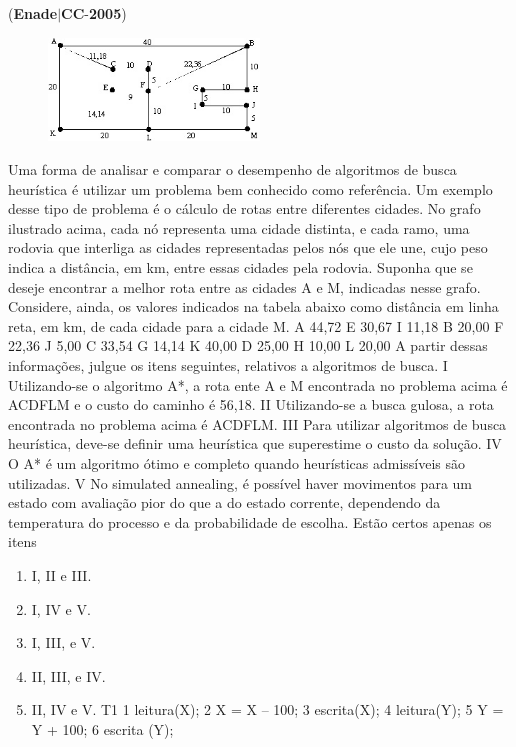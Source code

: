 \documentclass{exam}
\begin{document}
\begin{questions}
\question (\textbf{Enade}$|$\textbf{CC}-\textbf{2005}) \begin{figure}[H]
	\begin{center}
		\includegraphics[width=0.5\textwidth]{CIENCIA_DA_COMPUTACAO_Prova2005-utf8_figuras/fig-0020.jpg}
	\end{center}
\end{figure}
Uma forma de analisar e comparar o desempenho de algoritmos
de busca heurística é utilizar um problema bem conhecido como
referência. Um exemplo desse tipo de problema é o cálculo de
rotas entre diferentes cidades. No grafo ilustrado acima, cada nó
representa uma cidade distinta, e cada ramo, uma rodovia que
interliga as cidades representadas pelos nós que ele une, cujo peso
indica a distância, em km, entre essas cidades pela rodovia.
Suponha que se deseje encontrar a melhor rota entre as cidades A
e M, indicadas nesse grafo. Considere, ainda, os valores indicados
na tabela abaixo como distância em linha reta, em km, de cada
cidade para a cidade M.
A 44,72 E 30,67 I 11,18
B 20,00 F 22,36 J 5,00
C 33,54 G 14,14 K 40,00
D 25,00 H 10,00 L 20,00
A partir dessas informações, julgue os itens seguintes, relativos a
algoritmos de busca.
I Utilizando-se o algoritmo A*, a rota ente A e M encontrada no
problema acima é ACDFLM e o custo do caminho é 56,18.
II Utilizando-se a busca gulosa, a rota encontrada no problema
acima é ACDFLM.
III Para utilizar algoritmos de busca heurística, deve-se definir
uma heurística que superestime o custo da solução.
IV O A* é um algoritmo ótimo e completo quando heurísticas
admissíveis são utilizadas.
V No simulated annealing, é possível haver movimentos para um
estado com avaliação pior do que a do estado corrente,
dependendo da temperatura do processo e da probabilidade
de escolha.
Estão certos apenas os itens
	\begin{enumerate}[label=\alph*)]
		\item  I, II e III.
		\item  I, IV e V.
		\item  I, III, e V.
		\item  II, III, e IV.
		\item  II, IV e V.
T1
1 leitura(X);
2 X = X – 100;
3 escrita(X);
4 leitura(Y);
5 Y = Y + 100;
6 escrita (Y);


\end{enumerate}
\end{questions}
\end{document}
